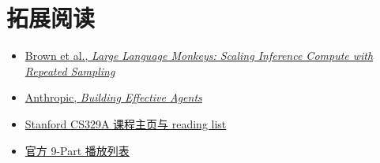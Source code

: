 \section{拓展阅读}

\begin{itemize}
    \item \href{https://arxiv.org/abs/2407.21787}{Brown et al., \emph{Large Language Monkeys: Scaling Inference Compute with Repeated Sampling}}
    \item \href{https://www.anthropic.com/research/building-effective-agents}{Anthropic, \emph{Building Effective Agents}}
    \item \href{https://cs329a.stanford.edu/}{Stanford CS329A 课程主页与 reading list}
    \item \href{https://www.youtube.com/playlist?list=PLangBM27OtEA}{官方 9-Part 播放列表}
\end{itemize}

